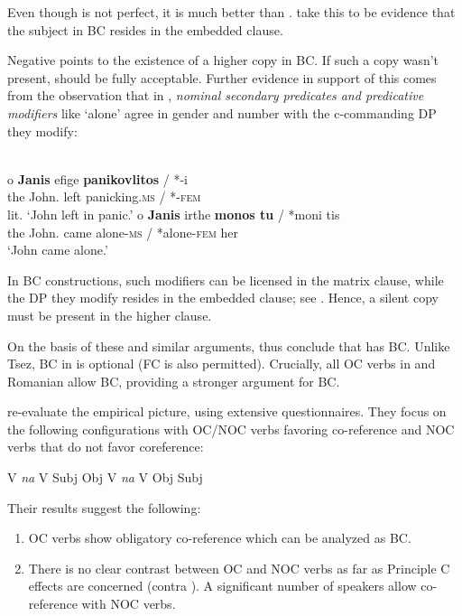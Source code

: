 \documentclass[output=paper]{langsci/langscibook}
\begin{document}
Even though  is not perfect, it is much better than . \citet{Alexiadou2010} take this to be evidence that the subject in BC resides in the embedded clause. 

Negative  points to the existence of a higher copy in BC. If such a copy wasn’t present,  should be fully acceptable. Further evidence in support of this comes from the observation that in , \textit{nominal secondary predicates and predicative modifiers} like ‘alone’ agree in gender and number with the c-commanding DP they modify:\pagebreak

\ea%
    \label{ex:alexiadou:13}
    \\
\ea \gll  o    \textbf{Janis}        efige  \textbf{panikovlitos} / *-i      \\
             the John.{\NOM}  left    panicking.\textsc{ms} / *-\textsc{fem}\\ 
    \glt        lit. ‘John left in panic.’
\ex \gll o    \textbf{Janis}         irthe   \textbf{monos tu} / *moni tis\\
               the John.{\NOM}  came   alone-\textsc{ms} / *alone-\textsc{fem} her\\
    \glt       ‘John came alone.’  
    \z
\z

In BC constructions, such modifiers can be licensed in the matrix clause, while the DP they modify resides in the embedded clause; see \citet[103--104, examples (36--38)]{Alexiadou2010}. Hence, a silent copy must be present in the higher clause. 

On the basis of these and similar arguments, \citet{Alexiadou2010} thus conclude that  has BC. Unlike Tsez, BC in  is optional (FC is also permitted). Crucially, all OC verbs in  and Romanian allow BC, providing a stronger argument for BC.

\citet{Tsakali2017} re-evaluate the empirical picture, using extensive questionnaires. They focus on the following configurations with OC\slash NOC verbs favoring co-reference and NOC verbs that do not favor coreference:


\ea%
    \label{ex:alexiadou:14}
    \ea V \textit{na} V Subj Obj
    \ex V \textit{na} V Obj Subj
    \z
\z

Their results suggest the following:

\begin{enumerate}
\item OC verbs show obligatory co-reference which can be analyzed as BC.
\item There is no clear contrast between OC and NOC verbs as far as Principle C effects are concerned (contra \citealt{Alexiadou2010}). A significant number of speakers allow co-reference with NOC verbs. 
\end{enumerate}
\end{document}
